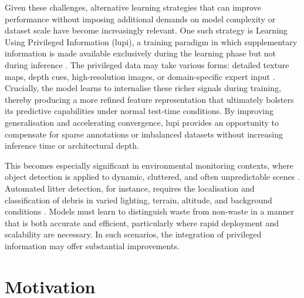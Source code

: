 Given these challenges, alternative learning strategies that can improve performance without imposing additional demands on model complexity or dataset scale have become increasingly relevant. One such strategy is Learning Using Privileged Information (\gls{lupi}), a training paradigm in which supplementary information is made available exclusively during the learning phase but not during inference \cite{lupi}. The privileged data may take various forms: detailed texture maps, depth cues, high-resolution images, or domain-specific expert input \cite{lupi, lupi_classification, lupiv3}. Crucially, the model learns to internalise these richer signals during training, thereby producing a more refined feature representation that ultimately bolsters its predictive capabilities under normal test-time conditions. By improving generalisation and accelerating convergence, \gls{lupi} provides an opportunity to compensate for sparse annotations or imbalanced datasets without increasing inference time or architectural depth.

This becomes especially significant in environmental monitoring contexts, where object detection is applied to dynamic, cluttered, and often unpredictable scenes \cite{soda_dataset, bdwdataset}. Automated litter detection, for instance, requires the localisation and classification of debris in varied lighting, terrain, altitude, and background conditions \cite{soda_dataset, taco2020}. Models must learn to distinguish waste from non-waste in a manner that is both accurate and efficient, particularly where rapid deployment and scalability are necessary. In such scenarios, the integration of privileged information may offer substantial improvements.

\section{Motivation}
\label{sec:motivation}

